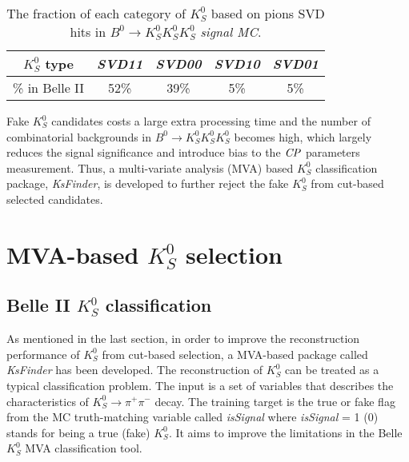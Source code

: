 \begin{table}[H]
	\centering
	\begin{tabular}{|c|c|c|c|c|}
		\hline
		$K_S^0$ type & \textit{SVD11} & \textit{SVD00} & \textit{SVD10} & \textit{SVD01}\\
		\hline
		\% in Belle II & 52\% & 39\% & 5\% & 5\%\\
		\hline
	\end{tabular}
	\caption{The fraction of each category of $K_S^0$ based on pions SVD hits in $B^0 \to K_S^0  K_S^0  K_S^0$ \textit{signal MC}.}
	\label{tab:svdxx}
\end{table}
\begin{comment}
\begin{figure}[htpb]
\centering
\texttt{[image: VXDGEO.png]}
\caption{Geometric structure of PXD and SVD in Belle II\cite{Abe:2010gxa}. SVD Layer 5 is at $r = 11$ cm and $K_S^0$ that decay outside are very likely to lose SVD hits information.}
\label{fig:vxdgeo}
\end{figure}
\end{comment}


Fake $K_S^0$ candidates costs a large extra processing time and the number of combinatorial backgrounds in $B^0 \to K_S^0  K_S^0  K_S^0$ becomes high, which largely reduces the signal significance and introduce bias to the $\it{CP}$ parameters measurement. Thus, a multi-variate analysis (MVA) based $K_S^0$ classification package, \textit{KsFinder}, is developed to further reject the fake $K_S^0$ from cut-based selected candidates.


\section{MVA-based $K_S^0$ selection}

\subsection{Belle II $K_S^0$ classification}
As mentioned in the last section, in order to improve the reconstruction performance of $K_S^0$ from cut-based selection, a MVA-based package called \textit{KsFinder} has been developed. The reconstruction of $K_S^0$ can be treated as a typical classification problem. The input is a set of variables that describes the characteristics of $K_S^0 \to \pi^+ \pi^-$ decay. The training  target is the true or fake flag from the MC truth-matching variable called \textit{isSignal} where \textit{isSignal} = 1 (0) stands for being a true (fake) $K_S^0$. It aims to improve the limitations in the Belle $K_S^0$ MVA classification tool. 
 
